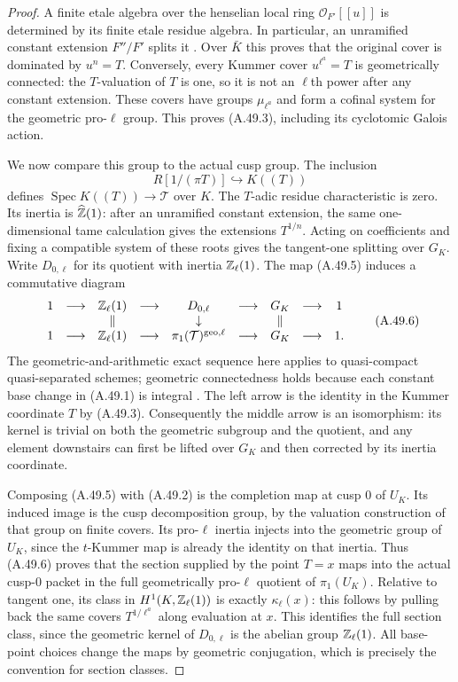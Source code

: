 \begin{proof}
A finite etale algebra over the henselian local ring
$\mathcal O_{F'}[[u]]$ is determined by its finite etale residue
algebra.  In particular, an unramified constant extension
$F''/F'$ splits it
\cite[Lemma 10.153.7, tag 04GK]{LegStacksHenselian2026}.
Over $\bar K$ this proves that the original cover is dominated
by $u^n=T$.  Conversely, every Kummer cover
$u^{\ell^a}=T$ is geometrically connected: the $T$-valuation of
$T$ is one, so it is not an $\ell$th power after any constant
extension.  These covers have groups $\mu_{\ell^a}$ and form a
cofinal system for the geometric pro-$\ell$ group.  This proves
(A.49.3), including its cyclotomic Galois action.

We now compare this group to the actual cusp group.  The inclusion
\[
                  R[1/(\pi T)]\hookrightarrow K((T))
\tag{A.49.5}
\]
defines $\operatorname{Spec}K((T))\to\mathcal T$ over $K$.
The $T$-adic residue characteristic is zero.  Its inertia is
$\widehat{\mathbb Z}(1)$: after an unramified constant extension, the
same one-dimensional tame calculation gives the extensions
$T^{1/n}$.  Acting on coefficients and fixing a compatible
system of these roots gives the tangent-one splitting over
$G_K$.  Write $D_{0,\ell}$ for its quotient with inertia
$\mathbb Z_\ell(1)$.  The map (A.49.5) induces a commutative diagram
\[
\begin{array}{ccccccccc}
1&\longrightarrow&\mathbb Z_\ell(1)&\longrightarrow&D_{0,\ell}
 &\longrightarrow&G_K&\longrightarrow&1\\
&&\Vert&&\downarrow&&\Vert\\
1&\longrightarrow&\mathbb Z_\ell(1)&\longrightarrow&
 \pi_1(\mathcal T)^{\mathrm{geo},\ell}
 &\longrightarrow&G_K&\longrightarrow&1.
\end{array}
\tag{A.49.6}
\]
The geometric-and-arithmetic exact sequence here applies to
quasi-compact quasi-separated schemes; geometric connectedness
holds because each constant base change in (A.49.1) is integral
\cite[Lemma 58.14.3, tag 0BTX]{LegStacksFields2026}.
The left arrow is the identity in the Kummer coordinate $T$ by
(A.49.3).  Consequently the middle arrow is an isomorphism:
its kernel is trivial on both the geometric subgroup and the
quotient, and any element downstairs can first be lifted over
$G_K$ and then corrected by its inertia coordinate.

Composing (A.49.5) with (A.49.2) is the completion map at cusp 0
of $U_K$.  Its induced image is the cusp decomposition group,
by the valuation construction of that group on finite covers.
Its pro-$\ell$ inertia injects into the geometric group of $U_K$,
since the $t$-Kummer map is already the identity on that inertia.
Thus (A.49.6) proves that the section supplied by the point
$T=x$ maps into the actual cusp-0 packet in the full
geometrically pro-$\ell$ quotient of $\pi_1(U_K)$.
Relative to tangent one, its class in
$H^1(K,\mathbb Z_\ell(1))$ is exactly $\kappa_\ell(x)$: this follows
by pulling back the same covers $T^{1/\ell^a}$ along evaluation
at $x$.  This identifies the full section class, since the
geometric kernel of $D_{0,\ell}$ is the abelian group
$\mathbb Z_\ell(1)$.  All base-point choices change the maps by geometric
conjugation, which is precisely the convention for section classes.


\end{proof}
